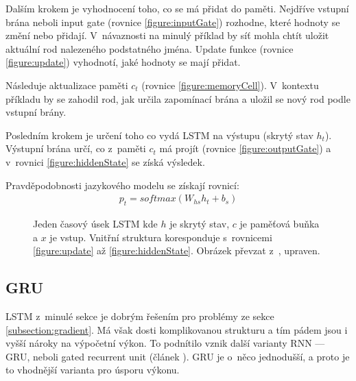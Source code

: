Dalším krokem je vyhodnocení toho, co se má přidat do paměti. Nejdříve vstupní brána neboli input gate (rovnice \ref{figure:inputGate}) rozhodne, které hodnoty se změní nebo přidají. V~návaznosti na minulý příklad by síť mohla chtít uložit aktuální rod nalezeného podstatného jména. Update funkce (rovnice \ref{figure:update}) vyhodnotí, jaké hodnoty se mají přidat.

Následuje aktualizace paměti $c_t$ (rovnice \ref{figure:memoryCell}). V~kontextu příkladu by se zahodil rod, jak určila zapomínací brána a uložil se nový rod podle vstupní brány.

Posledním krokem je určení toho co vydá LSTM na výstupu (skrytý stav $h_t$). Výstupní brána určí, co z~paměti $c_t$ má projít (rovnice \ref{figure:outputGate}) a v~rovnici \ref{figure:hiddenState} se získá výsledek.

Pravděpodobnosti jazykového modelu se získají rovnicí:
\begin{align}
    p_t = softmax(W_{hs}h_{t} + b_{s})
\end{align}


\begin{figure}[H]
    \begin{center}
    \end{center}
	\caption{Jeden časový úsek LSTM kde $h$ je skrytý stav, $c$ je paměťová buňka a $x$ je vstup. Vnitřní struktura koresponduje s~rovnicemi \ref{figure:update} až \ref{figure:hiddenState}. Obrázek převzat z~\cite{understandingLSTM}, upraven.}
	\label{img:LSTM}
\end{figure}



\subsection{GRU}\label{section:GRU}
LSTM z~minulé sekce je dobrým řešením pro problémy ze sekce \ref{subsection:gradient}. Má však dosti komplikovanou strukturu a tím pádem jsou i vyšší nároky na výpočetní výkon. To podnítilo vznik další varianty RNN --- GRU, neboli gated recurrent unit (článek \cite{GRU}). GRU je o~něco jednodušší, a proto je to vhodnější varianta pro úsporu výkonu.


